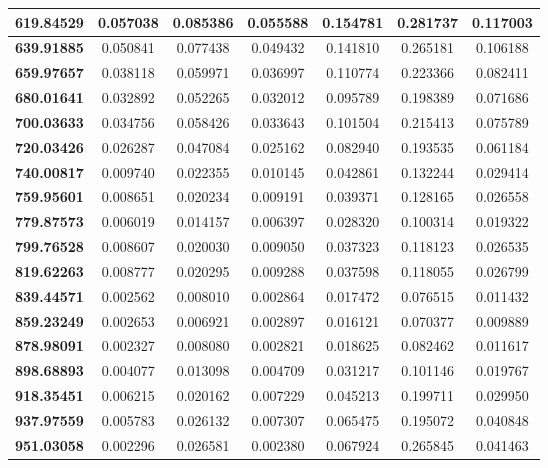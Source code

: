 \documentclass[11pt]{article}
\begin{document}
\begin{table}[htbp]
\begin{center}
\begin{tabular}{|c|c|c|c|c|c|c|}
		\textbf{619.84529} & 0.057038 & 0.085386 & 0.055588 & 0.154781 & 0.281737 & 0.117003 \\ \hline
		\textbf{639.91885} & 0.050841 & 0.077438 & 0.049432 & 0.141810 & 0.265181 & 0.106188 \\ \hline
		\textbf{659.97657} & 0.038118 & 0.059971 & 0.036997 & 0.110774 & 0.223366 & 0.082411 \\ \hline
		\textbf{680.01641} & 0.032892 & 0.052265 & 0.032012 & 0.095789 & 0.198389 & 0.071686 \\ \hline
		\textbf{700.03633} & 0.034756 & 0.058426 & 0.033643 & 0.101504 & 0.215413 & 0.075789 \\ \hline
		\textbf{720.03426} & 0.026287 & 0.047084 & 0.025162 & 0.082940 & 0.193535 & 0.061184 \\ \hline
		\textbf{740.00817} & 0.009740 & 0.022355 & 0.010145 & 0.042861 & 0.132244 & 0.029414 \\ \hline
		\textbf{759.95601} & 0.008651 & 0.020234 & 0.009191 & 0.039371 & 0.128165 & 0.026558 \\ \hline
		\textbf{779.87573} & 0.006019 & 0.014157 & 0.006397 & 0.028320 & 0.100314 & 0.019322 \\ \hline
		\textbf{799.76528} & 0.008607 & 0.020030 & 0.009050 & 0.037323 & 0.118123 & 0.026535 \\ \hline
		\textbf{819.62263} & 0.008777 & 0.020295 & 0.009288 & 0.037598 & 0.118055 & 0.026799 \\ \hline
		\textbf{839.44571} & 0.002562 & 0.008010 & 0.002864 & 0.017472 & 0.076515 & 0.011432 \\ \hline
		\textbf{859.23249} & 0.002653 & 0.006921 & 0.002897 & 0.016121 & 0.070377 & 0.009889 \\ \hline
		\textbf{878.98091} & 0.002327 & 0.008080 & 0.002821 & 0.018625 & 0.082462 & 0.011617 \\ \hline
		\textbf{898.68893} & 0.004077 & 0.013098 & 0.004709 & 0.031217 & 0.101146 & 0.019767 \\ \hline
		\textbf{918.35451} & 0.006215 & 0.020162 & 0.007229 & 0.045213 & 0.199711 & 0.029950 \\ \hline
		\textbf{937.97559} & 0.005783 & 0.026132 & 0.007307 & 0.065475 & 0.195072 & 0.040848 \\ \hline
		\textbf{951.03058} & 0.002296 & 0.026581 & 0.002380 & 0.067924 & 0.265845 & 0.041463 \\ \hline
	\end{tabular}
	\end{center}
\end{table}
\end{document}
